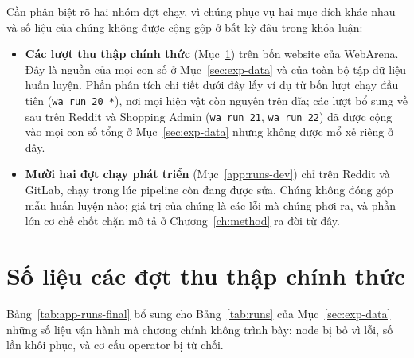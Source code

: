 Cần phân biệt rõ hai nhóm đợt chạy, vì chúng phục vụ hai mục đích khác nhau và số
liệu của chúng không được cộng gộp ở bất kỳ đâu trong khóa luận:

\begin{itemize}
  \item \textbf{Các lượt thu thập chính thức} (Mục~\ref{app:runs-final}) trên
  bốn website của WebArena. Đây là nguồn của mọi con số ở
  Mục~\ref{sec:exp-data} và của toàn bộ tập dữ liệu huấn luyện. Phần phân
  tích chi tiết dưới đây lấy ví dụ từ bốn lượt chạy đầu tiên
  (\texttt{wa\_run\_20\_*}), nơi mọi hiện vật còn nguyên trên đĩa; các lượt
  bổ sung về sau trên Reddit và Shopping Admin (\texttt{wa\_run\_21},
  \texttt{wa\_run\_22}) đã được cộng vào mọi con số tổng ở
  Mục~\ref{sec:exp-data} nhưng không được mổ xẻ riêng ở đây.
  \item \textbf{Mười hai đợt chạy phát triển} (Mục~\ref{app:runs-dev}) chỉ trên
  Reddit và GitLab, chạy trong lúc pipeline còn đang được sửa. Chúng không
  đóng góp mẫu huấn luyện nào; giá trị của chúng là các lỗi mà chúng phơi ra,
  và phần lớn cơ chế chốt chặn mô tả ở Chương~\ref{ch:method} ra đời từ đây.
\end{itemize}

\section{Số liệu các đợt thu thập chính thức}
\label{app:runs-final}

Bảng~\ref{tab:app-runs-final} bổ sung cho Bảng~\ref{tab:runs} của
Mục~\ref{sec:exp-data} những số liệu vận hành mà chương chính không trình
bày: node bị bỏ vì lỗi, số lần khôi phục, và cơ cấu operator bị từ chối.

